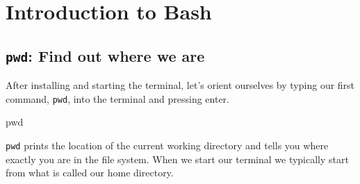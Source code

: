 \documentclass[
  letterpaper,
  DIV=11,
  numbers=noendperiod]{scrreprt}
\author{}
\date{}
\newenvironment{Shaded}{}{}
\newcommand{\BuiltInTok}[1]{\textcolor[rgb]{0.84,0.23,0.29}{#1}}
\renewcommand*\contentsname{Table of contents}
\newcommand\contentsname{Table of contents}
\begin{document}

\renewcommand*\contentsname{Table of contents}
{
\hypersetup{linkcolor=}
\setcounter{tocdepth}{2}
\tableofcontents
}
\chapter{Introduction to Bash}\label{introduction-to-bash}

\section{\texorpdfstring{\texttt{pwd}: Find out where we
are}{pwd: Find out where we are}}\label{pwd-find-out-where-we-are}

After installing and starting the terminal, let's orient ourselves by
typing our first command, \texttt{pwd}, into the terminal and pressing
enter.

\begin{Shaded}
\begin{Highlighting}[]
\BuiltInTok{pwd}
\end{Highlighting}
\end{Shaded}

\texttt{pwd} prints the location of the current working directory and
tells you where exactly you are in the file system. When we start our
terminal we typically start from what is called our home directory.
\end{document}
